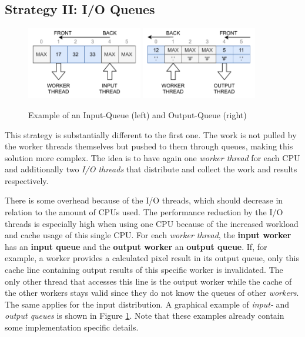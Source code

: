 \subsection{Strategy II: I/O Queues}
\label{ssec:strategy-ii}

\begin{figure}[b]
   \centering
   \includegraphics[width=0.45\textwidth]{mandelbrot/assets/input-queue.pdf}
   \includegraphics[width=0.45\textwidth]{mandelbrot/assets/output-queue.pdf}
 \caption{Example of an Input-Queue (left) and Output-Queue (right)}
 \label{fig:queues}
\end{figure}

This strategy is substantially different to the first one. The work is not pulled by the worker threads themselves but pushed to them through queues, making this solution more complex. The idea is to have again one \textit{worker thread} for each CPU and additionally two \textit{I/O threads} that distribute and collect the work and results respectively.

There is some overhead because of the I/O threads, which should decrease in relation to the amount of CPUs used. The performance reduction by the I/O threads is especially high when using one CPU because of the increased workload and cache usage of this single CPU. For each \textit{worker thread}, the \textbf{input worker} has an \textbf{input queue} and the \textbf{output worker} an \textbf{output queue}. If, for example, a worker provides a calculated pixel result in its output queue, only this cache line containing output results of this specific worker is invalidated. The only other thread that accesses this line is the output worker while the cache of the other workers stays valid since they do not know the queues of other \textit{workers}. The same applies for the input distribution. A graphical example of \textit{input-} and \textit{output queues} is shown in Figure \ref{fig:queues}. Note that these examples already contain some implementation specific details.

